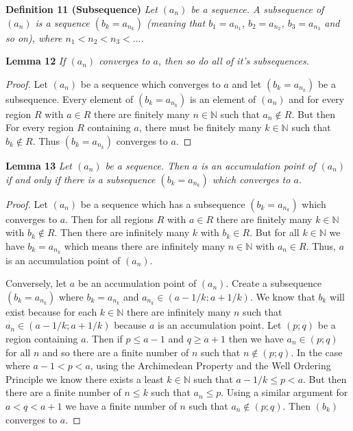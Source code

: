 \documentclass{article}
\begin{document}
\begin{flushleft}
\textbf{Definition 11 (Subsequence)}
\textsl{Let $(a_n)$ be a sequence. A subsequence of $(a_n)$ is a sequence $(b_k=a_{n_k})$ (meaning that $b_1=a_{n_1}$, $b_2=a_{n_2}$, $b_3=a_{n_3}$ and so on), where $n_1<n_2<n_3< \dots$.}\newline

\textbf{Lemma 12}
\textsl{If $(a_n)$ converges to $a$, then so do all of it's subsequences.}
\begin{proof}
Let $(a_n)$ be a sequence which converges to $a$ and let $(b_k = a_{n_k})$ be a subsequence. Every element of $(b_k=a_{n_k})$ is an element of $(a_n)$ and for every region $R$ with $a \in R$ there are finitely many $n \in \mathbb{N}$ such that $a_n \notin R$. But then For every region $R$ containing $a$, there must be finitely many $k \in \mathbb{N}$ such that $b_k \notin R$. Thus $(b_k = a_{n_k})$ converges to $a$.
\end{proof}

\textbf{Lemma 13}
\textsl{Let $(a_n)$ be a sequence. Then $a$ is an accumulation point of $(a_n)$ if and only if there is a subsequence $(b_k = a_{n_k})$ which converges to $a$.}
\begin{proof}
Let $(a_n)$ be a sequence which has a subsequence $(b_k = a_{n_k})$ which converges to $a$. Then for all regions $R$ with $a \in R$ there are finitely many $k \in \mathbb{N}$ with $b_k \notin R$. Then there are infinitely many $k$ with $b_k \in R$. But for all $k \in \mathbb{N}$ we have $b_k = a_{n_k}$ which means there are infinitely many $n \in \mathbb{N}$ with $a_n \in R$. Thus, $a$ is an accumulation point of $(a_n)$.\newline

Conversely, let $a$ be an accumulation point of $(a_n)$. Create a subsequence $(b_k = a_{n_k})$ where $b_k = a_{n_k}$ and $a_{n_k} \in (a - 1/k ; a + 1/k)$. We know that $b_k$ will exist because for each $k \in \mathbb{N}$ there are infinitely many $n$ such that $a_n \in (a - 1/k ; a + 1/k)$ because $a$ is an accumulation point. Let $(p;q)$ be a region containing $a$. Then if $p \leq a - 1$ and $q \geq a + 1$ then we have $a_n \in (p;q)$ for all $n$ and so there are a finite number of $n$ such that $n \notin (p;q)$. In the case where $a - 1 < p < a$, using the Archimedean Property and the Well Ordering Principle we know there exists a least $k \in \mathbb{N}$ such that $a-1/k \leq p < a$. But then there are a finite number of $n \leq k$ such that $a_n \leq p$. Using a similar argument for $a < q < a + 1$ we have a finite number of $n$ such that $a_n \notin (p;q)$. Then $(b_k)$ converges to $a$.
\end{proof}


\end{flushleft}
\end{document}
